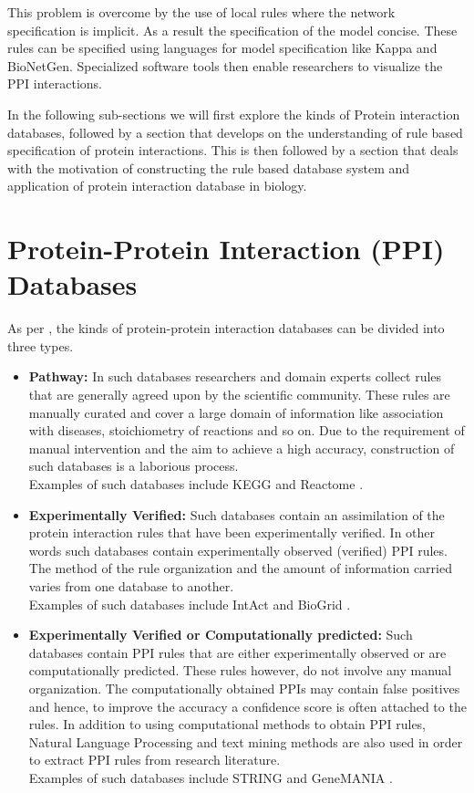 \documentclass[msc,deptreport,ai]{infthesis}      %
\begin{document}
This problem is overcome by the use of local rules where the network specification is implicit. As a result the specification of the model concise. These rules can be specified using languages for model specification like Kappa \cite{kappa}  and BioNetGen\cite{bioNetGen}. Specialized software tools then enable researchers to visualize the PPI interactions.

In the following sub-sections we will first explore the kinds of Protein interaction databases, followed by a section that develops on the understanding of rule based specification of protein interactions. This is then followed by a section that deals with the motivation of constructing the rule based database system and application of protein interaction database in biology.

\section{Protein-Protein Interaction (PPI) Databases}
As per \cite{typesOfPPIdb}, the kinds of protein-protein interaction databases can be divided into three types.
\begin{itemize}
	\item
	\textbf{Pathway:} In such databases researchers and domain experts collect rules that are generally agreed upon by the scientific community. These rules are manually curated and cover a large domain of information like association with diseases, stoichiometry of reactions and so on. Due to the requirement of manual intervention and the aim to achieve a high accuracy, construction of such databases is a laborious process.\\ Examples of such databases include KEGG \cite{kegg} and Reactome \cite{reactome}.
	\item
	\textbf{Experimentally Verified: } Such databases contain an assimilation of the protein interaction rules that have been experimentally verified. In other words such databases contain experimentally observed (verified) PPI rules. The method of the rule organization and the amount of information carried varies from one database to another. \\Examples of such databases include IntAct \cite{intact} and BioGrid \cite{biogrid}.
	\item
	\textbf{Experimentally Verified or Computationally predicted: } Such databases contain PPI rules that are either experimentally observed or are computationally predicted. These rules however, do not involve any manual organization. The computationally obtained PPIs may contain false positives and hence, to improve the accuracy a confidence score is often attached to the rules. In addition to using computational methods to obtain PPI rules, Natural Language Processing and text mining methods are also used in order to extract PPI rules from research literature.\\  Examples of such databases include  STRING \cite{string} and GeneMANIA \cite{genemania}.
\end{itemize}
\end{document}
